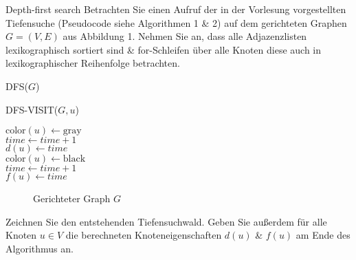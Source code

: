 \documentclass{exercisesheet}
\begin{document}
\begin{exercise}{Depth-first search}
  Betrachten Sie einen Aufruf der in der Vorlesung vorgestellten Tiefensuche (Pseudocode siehe Algorithmen 1 \& 2) auf dem gerichteten Graphen $G = (V, E)$ aus Abbildung 1. Nehmen Sie an, dass alle Adjazenzlisten lexikographisch sortiert sind \& for-Schleifen über alle Knoten diese auch in lexikographischer Reihenfolge betrachten.
  \begin{algorithm}[ht]
    \caption{DFS($G$)}
  \end{algorithm}

  \begin{algorithm}[ht]
    \caption{DFS-VISIT($G, u$)}
    $\text{color}(u) \gets \text{gray}$ \\
    $time \gets time + 1$ \\
    $d(u) \gets time$ \\
    $\text{color}(u) \gets \text{black}$ \\
    $time \gets time + 1$ \\
    $f(u) \gets time$
  \end{algorithm}

  \begin{figure}[ht]
    \centering
    \caption{Gerichteter Graph $G$}
  \end{figure}

  Zeichnen Sie den entstehenden Tiefensuchwald. Geben Sie außerdem für alle Knoten $u \in V$ die berechneten Knoteneigenschaften $d(u)$ \& $f(u)$ am Ende des Algorithmus an.
\end{exercise}
\end{document}
